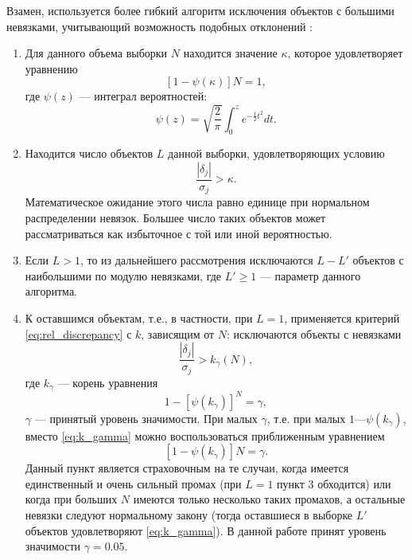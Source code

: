 \documentclass[a4paper, oneside, 14pt]{article}
\newcommand{\npar}{\par\vspace{\baselineskip}}
\begin{document}
Взамен, используется более гибкий алгоритм исключения объектов с большими невязками, учитывающий возможность подобных отклонений \cite{N.2003}:\npar

\begin{enumerate}
  \item Для данного объема выборки $ N $ находится значение $ \kappa $, которое удовлетворяет уравнению
  \begin{equation}
    \left[ 1 - \psi(\kappa) \right] N = 1,
  \end{equation}
  где $ \psi(z) $ --- интеграл вероятностей:
  \begin{equation}
    \psi(z) = \sqrt{\frac{2}{\pi}} \int_0^z e^{-\frac{1}{2} t^2} dt.
  \end{equation}

  \item Находится число объектов $ L $ данной выборки, удовлетворяющих условию
  \begin{equation}
    \label{eq:kappa_condition}
    \frac{|\delta_j|}{\sigma_j} > \kappa.
  \end{equation}
  Математическое ожидание этого числа равно единице при нормальном распределении невязок. Большее число таких объектов может рассматриваться как избыточное с той или иной вероятностью.

  \item Если $ L > 1 $, то из дальнейшего рассмотрения исключаются $ L - L' $ объектов с наибольшими по модулю невязками, где $ L' \ge 1 $ --- параметр данного алгоритма.

  \item К оставшимся объектам, т.е., в частности, при $ L = 1 $, применяется критерий \eqref{eq:rel_discrepancy} с $ k $, зависящим от $ N $: исключаются объекты с невязками
  \begin{equation}
    \frac{|\delta_j|}{\sigma_j} > k_\gamma(N),
  \end{equation}
  где $ k_\gamma $ --- корень уравнения
  \begin{equation}
    \label{eq:k_gamma}
    1 - \left[ \psi(k_\gamma) \right]^N = \gamma,
  \end{equation}
  $ \gamma $ --- принятый уровень значимости. При малых $ \gamma $, т.е. при малых $ 1 — \psi(k_\gamma) $, вместо \eqref{eq:k_gamma} можно воспользоваться приближенным уравнением
  \begin{equation}
    \left[ 1 - \psi(k_\gamma) \right] N = \gamma.
  \end{equation}
  Данный пункт является страховочным на те случаи, когда имеется единственный и очень сильный промах (при $ L = 1 $ пункт 3 обходится) или когда при больших $ N $ имеются только несколько таких промахов, а остальные невязки следуют нормальному закону (тогда оставшиеся в выборке $ L'$ объектов удовлетворяют \eqref{eq:k_gamma}). В данной работе принят уровень значимости $ \gamma = 0.05 $.
\end{enumerate}
\end{document}
